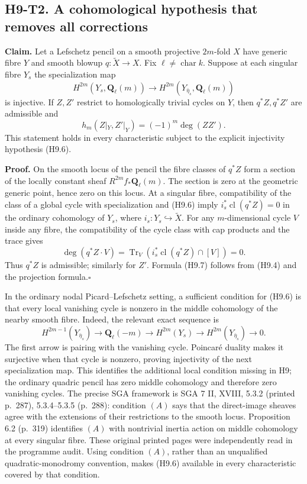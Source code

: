 \documentclass[11pt,a4paper]{article}
\begin{document}
\subsection*{H9-T2. A cohomological hypothesis that removes all corrections}

\textbf{Claim.} Let a Lefschetz pencil on a smooth projective $2m$-fold
$X$ have generic fibre $Y$ and smooth blowup $q:\widetilde X\to X$.
Fix $\ell\ne\operatorname{char}k$. Suppose at each singular fibre $Y_s$
the specialization map
\[
 H^{2m}(Y_s,\mathbf Q_\ell(m))\longrightarrow
 H^{2m}(Y_{\bar\eta_s},\mathbf Q_\ell(m))       \tag{H9.6}
\]
is injective. If $Z,Z'$ restrict to homologically trivial cycles on $Y$,
then $q^*Z,q^*Z'$ are admissible and
\[
 h_m(Z|_Y,Z'|_Y)=(-1)^m\deg(ZZ').               \tag{H9.7}
\]
This statement holds in every characteristic subject to the explicit
injectivity hypothesis (H9.6).

\textbf{Proof.} On the smooth locus of the pencil the fibre classes of
$q^*Z$ form a section of the locally constant sheaf
$R^{2m}f_*\mathbf Q_\ell(m)$. The section is zero at the geometric generic
point, hence zero on this locus. At a singular fibre, compatibility of the
class of a global cycle with specialization and (H9.6) imply
$i_s^*\operatorname{cl}(q^*Z)=0$ in the ordinary cohomology of $Y_s$,
where $i_s:Y_s\hookrightarrow\widetilde X$. For any $m$-dimensional cycle $V$
inside any fibre, the compatibility of the cycle class with cap products
and the trace gives
\[
 \deg(q^*Z\cdot V)=
 \operatorname{Tr}_{V}(i_s^*\operatorname{cl}(q^*Z)\cap[V])=0.
\]
Thus $q^*Z$ is admissible; similarly for $Z'$. Formula (H9.7) follows
from (H9.4) and the projection formula.\hfill$\square$

In the ordinary nodal Picard--Lefschetz setting, a sufficient condition
for (H9.6) is that every local vanishing cycle is nonzero in the middle
cohomology of the nearby smooth fibre. Indeed, the relevant exact sequence
is
\[
 H^{2m-1}(Y_{\bar\eta_s})\longrightarrow\mathbf Q_\ell(-m)
 \longrightarrow H^{2m}(Y_s)
 \longrightarrow H^{2m}(Y_{\bar\eta_s})\longrightarrow0.
\]
The first arrow is pairing with the vanishing cycle. Poincar\'e duality
makes it surjective when that cycle is nonzero, proving injectivity of the
next specialization map. This identifies the additional local condition
missing in H9; the ordinary quadric pencil has zero middle cohomology and
therefore zero vanishing cycles. The precise SGA framework is SGA 7 II,
XVIII, 5.3.2 (printed p.~287), 5.3.4--5.3.5 (p.~288): condition $(A)$ says
that the direct-image sheaves agree with the extensions of their
restrictions to the smooth locus. Proposition 6.2 (p.~319) identifies
$(A)$ with nontrivial inertia action on middle cohomology at every
singular fibre. These original printed pages were independently read in
the programme audit. Using condition $(A)$, rather than an unqualified
quadratic-monodromy convention, makes (H9.6) available in every
characteristic covered by that condition.
\end{document}

